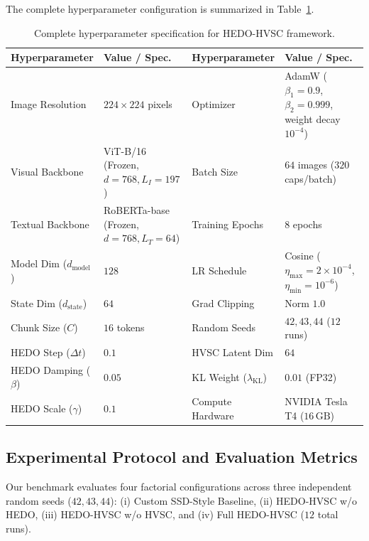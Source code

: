 \documentclass[pdflatex,sn-mathphys-num]{sn-jnl}%
\begin{document}
The complete hyperparameter configuration is summarized in Table~\ref{tab:hyperparameters}.

\begin{table}[!htbp]
\centering
\footnotesize
\caption{Complete hyperparameter specification for HEDO-HVSC framework.}
\label{tab:hyperparameters}
\setlength{\tabcolsep}{2.5pt}
\renewcommand{\arraystretch}{1.15}
\begin{tabularx}{\textwidth}{@{}>{\raggedright\arraybackslash}p{}>{\raggedright\arraybackslash}p{}|>{\raggedright\arraybackslash}p{}>{\raggedright\arraybackslash}X@{}}
\toprule
\textbf{Hyperparameter} & \textbf{Value / Spec.} & \textbf{Hyperparameter} & \textbf{Value / Spec.} \\
\midrule
Image Resolution & $224 \times 224$ pixels & Optimizer & AdamW ($\beta_1=0.9$, $\beta_2=0.999$, weight decay $10^{-4}$) \\
Visual Backbone & ViT-B/16 (Frozen, $d=768, L_I=197$) & Batch Size & $64$ images ($320$ caps/batch) \\
Textual Backbone & RoBERTa-base (Frozen, $d=768, L_T=64$) & Training Epochs & $8$ epochs \\
Model Dim ($d_{\text{model}}$) & $128$ & LR Schedule & Cosine ($\eta_{\text{max}}=2\times 10^{-4}$, $\eta_{\text{min}}=10^{-6}$) \\
State Dim ($d_{\text{state}}$) & $64$ & Grad Clipping & Norm $1.0$ \\
Chunk Size ($C$) & $16$ tokens & Random Seeds & $42, 43, 44$ ($12$ runs) \\
HEDO Step ($\Delta t$) & $0.1$ & HVSC Latent Dim & $64$ \\
HEDO Damping ($\beta$) & $0.05$ & KL Weight ($\lambda_{\text{KL}}$) & $0.01$ (FP32) \\
HEDO Scale ($\gamma$) & $0.1$ & Compute Hardware & NVIDIA Tesla T4 ($16\,\text{GB}$) \\
\bottomrule
\end{tabularx}
\end{table}

\subsection{Experimental Protocol and Evaluation Metrics}
Our benchmark evaluates four factorial configurations across three independent random seeds ($42, 43, 44$): (i) Custom SSD-Style Baseline, (ii) HEDO-HVSC w/o HEDO, (iii) HEDO-HVSC w/o HVSC, and (iv) Full HEDO-HVSC ($12$ total runs).
\end{document}

